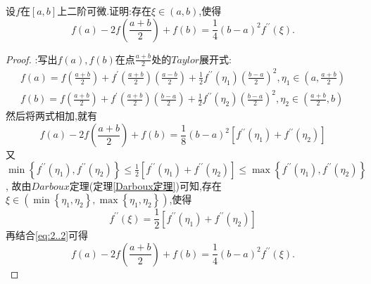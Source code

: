 \documentclass[lang=cn,newtx,10pt,scheme=chinese]{../Template/elegantbook}
\begin{document}
\begin{example}
    设\(f\)在\([a,b]\)上二阶可微.证明:存在\(\xi\in(a,b)\),使得
    \begin{equation}
        f(a)-2f\left(\frac{a + b}{2}\right)+f(b)=\frac{1}{4}(b - a)^{2}f^{\prime\prime}(\xi).
        \nonumber
    \end{equation}
    \begin{proof}
        {\color{blue} }:写出$f(a),f(b)$在点$\frac{a+b}{2}$处的$Taylor$展开式:
        \begin{gather}
            f(a)=f\left( \frac{a+b}{2} \right) +f^{\prime}\left( \frac{a+b}{2} \right) \left( \frac{a-b}{2} \right) +\frac{1}{2}f^{\prime\prime}(\eta _1)\left( \frac{b-a}{2} \right) ^2,\eta _1\in \left( a,\frac{a+b}{2} \right) 
            \nonumber\\
f(b)=f\left( \frac{a+b}{2} \right) +f^{\prime}\left( \frac{a+b}{2} \right) \left( \frac{b-a}{2} \right) +\frac{1}{2}f^{\prime\prime}(\eta _2)\left( \frac{b-a}{2} \right) ^2,\eta _2\in \left( \frac{a+b}{2},b \right) 
            \nonumber
        \end{gather}
        然后将两式相加,就有
        \begin{equation}\label{eq:2..2}
            f\left( a \right) -2f\left( \frac{a+b}{2} \right) +f\left( b \right) =\frac{1}{8}\left( b-a \right) ^2\left[ f^{\prime\prime}\left( \eta _1 \right) +f^{\prime\prime}\left( \eta _2 \right) \right]
        \end{equation}
        又$\min \left\{ f^{\prime\prime}\left( \eta _1 \right) ,f^{\prime\prime}\left( \eta _2 \right) \right\} \le \frac{1}{2}\left[ f^{\prime\prime}\left( \eta _1 \right) +f^{\prime\prime}\left( \eta _2 \right) \right] \le \max \left\{ f^{\prime\prime}\left( \eta _1 \right) ,f^{\prime\prime}\left( \eta _2 \right) \right\}$,
        故由$Darboux$定理(定理\ref{Darboux定理})可知,存在$\xi\in\left( \min \left\{ \eta _1,\eta _2 \right\} ,\max \left\{ \eta _1,\eta _2 \right\} \right)$,使得
        \begin{equation}
            f^{\prime\prime}\left( \xi \right) =\frac{1}{2}\left[ f^{\prime\prime}\left( \eta _1 \right) +f^{\prime\prime}\left( \eta _2 \right) \right]
            \nonumber
        \end{equation}
        再结合\eqref{eq:2..2}可得
        \begin{equation}
            f(a)-2f\left(\frac{a + b}{2}\right)+f(b)=\frac{1}{4}(b - a)^{2}f^{\prime\prime}(\xi).
            \nonumber
        \end{equation}


\end{proof}
\end{example}
\end{document}
